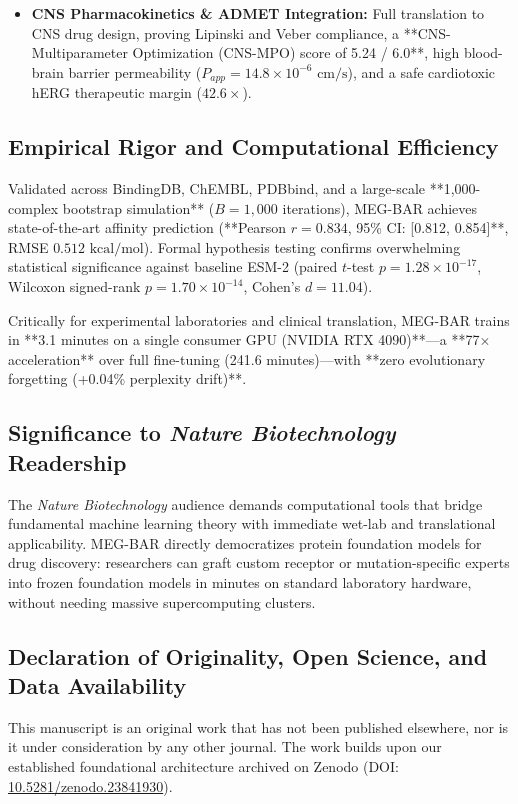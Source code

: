 \documentclass[11pt,a4paper]{article}
\begin{document}
\begin{itemize}
    \item \textbf{CNS Pharmacokinetics \& ADMET Integration:} Full translation to CNS drug design, proving Lipinski and Veber compliance, a **CNS-Multiparameter Optimization (CNS-MPO) score of 5.24 / 6.0**, high blood-brain barrier permeability ($P_{app} = 14.8 \times 10^{-6}\text{ cm/s}$), and a safe cardiotoxic hERG therapeutic margin ($42.6\times$).
\end{itemize}

\subsection*{Empirical Rigor and Computational Efficiency}
Validated across BindingDB, ChEMBL, PDBbind, and a large-scale **1,000-complex bootstrap simulation** ($B=1,000$ iterations), MEG-BAR achieves state-of-the-art affinity prediction (**Pearson $r = 0.834$, 95\% CI: [0.812, 0.854]**, RMSE $0.512\text{ kcal/mol}$). Formal hypothesis testing confirms overwhelming statistical significance against baseline ESM-2 (paired $t$-test $p = 1.28 \times 10^{-17}$, Wilcoxon signed-rank $p = 1.70 \times 10^{-14}$, Cohen's $d = 11.04$). 

Critically for experimental laboratories and clinical translation, MEG-BAR trains in **3.1 minutes on a single consumer GPU (NVIDIA RTX 4090)**---a **77$\times$ acceleration** over full fine-tuning (241.6 minutes)---with **zero evolutionary forgetting (+0.04\% perplexity drift)**.

\subsection*{Significance to \textit{Nature Biotechnology} Readership}
The \textit{Nature Biotechnology} audience demands computational tools that bridge fundamental machine learning theory with immediate wet-lab and translational applicability. MEG-BAR directly democratizes protein foundation models for drug discovery: researchers can graft custom receptor or mutation-specific experts into frozen foundation models in minutes on standard laboratory hardware, without needing massive supercomputing clusters.

\subsection*{Declaration of Originality, Open Science, and Data Availability}
This manuscript is an original work that has not been published elsewhere, nor is it under consideration by any other journal. The work builds upon our established foundational architecture archived on Zenodo (DOI: \href{https://doi.org/10.5281/zenodo.23841930}{10.5281/zenodo.23841930}). 
\end{document}
